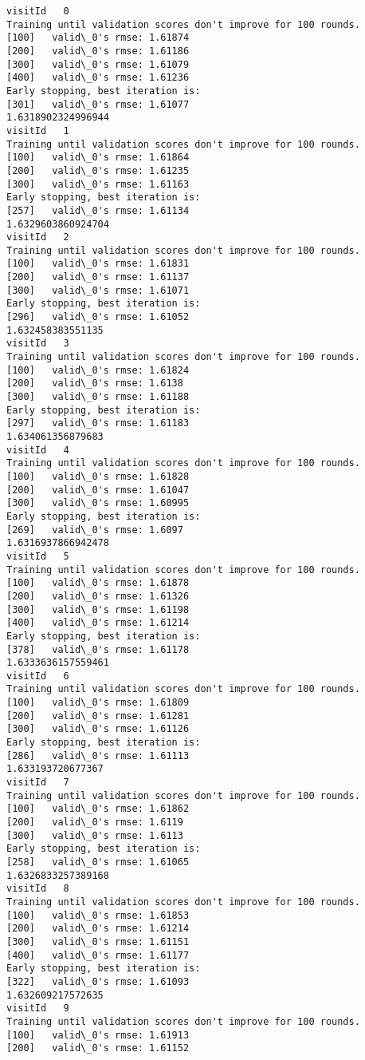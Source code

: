 \documentclass[11pt]{article}
\begin{document}
    \begin{Verbatim}[commandchars=\\\{\}]
visitId   0
Training until validation scores don't improve for 100 rounds.
[100]	valid\_0's rmse: 1.61874
[200]	valid\_0's rmse: 1.61186
[300]	valid\_0's rmse: 1.61079
[400]	valid\_0's rmse: 1.61236
Early stopping, best iteration is:
[301]	valid\_0's rmse: 1.61077
1.6318902324996944
visitId   1
Training until validation scores don't improve for 100 rounds.
[100]	valid\_0's rmse: 1.61864
[200]	valid\_0's rmse: 1.61235
[300]	valid\_0's rmse: 1.61163
Early stopping, best iteration is:
[257]	valid\_0's rmse: 1.61134
1.6329603860924704
visitId   2
Training until validation scores don't improve for 100 rounds.
[100]	valid\_0's rmse: 1.61831
[200]	valid\_0's rmse: 1.61137
[300]	valid\_0's rmse: 1.61071
Early stopping, best iteration is:
[296]	valid\_0's rmse: 1.61052
1.632458383551135
visitId   3
Training until validation scores don't improve for 100 rounds.
[100]	valid\_0's rmse: 1.61824
[200]	valid\_0's rmse: 1.6138
[300]	valid\_0's rmse: 1.61188
Early stopping, best iteration is:
[297]	valid\_0's rmse: 1.61183
1.634061356879683
visitId   4
Training until validation scores don't improve for 100 rounds.
[100]	valid\_0's rmse: 1.61828
[200]	valid\_0's rmse: 1.61047
[300]	valid\_0's rmse: 1.60995
Early stopping, best iteration is:
[269]	valid\_0's rmse: 1.6097
1.6316937866942478
visitId   5
Training until validation scores don't improve for 100 rounds.
[100]	valid\_0's rmse: 1.61878
[200]	valid\_0's rmse: 1.61326
[300]	valid\_0's rmse: 1.61198
[400]	valid\_0's rmse: 1.61214
Early stopping, best iteration is:
[378]	valid\_0's rmse: 1.61178
1.6333636157559461
visitId   6
Training until validation scores don't improve for 100 rounds.
[100]	valid\_0's rmse: 1.61809
[200]	valid\_0's rmse: 1.61281
[300]	valid\_0's rmse: 1.61126
Early stopping, best iteration is:
[286]	valid\_0's rmse: 1.61113
1.633193720677367
visitId   7
Training until validation scores don't improve for 100 rounds.
[100]	valid\_0's rmse: 1.61862
[200]	valid\_0's rmse: 1.6119
[300]	valid\_0's rmse: 1.6113
Early stopping, best iteration is:
[258]	valid\_0's rmse: 1.61065
1.6326833257389168
visitId   8
Training until validation scores don't improve for 100 rounds.
[100]	valid\_0's rmse: 1.61853
[200]	valid\_0's rmse: 1.61214
[300]	valid\_0's rmse: 1.61151
[400]	valid\_0's rmse: 1.61177
Early stopping, best iteration is:
[322]	valid\_0's rmse: 1.61093
1.632609217572635
visitId   9
Training until validation scores don't improve for 100 rounds.
[100]	valid\_0's rmse: 1.61913
[200]	valid\_0's rmse: 1.61152

\end{Verbatim}
\end{document}
